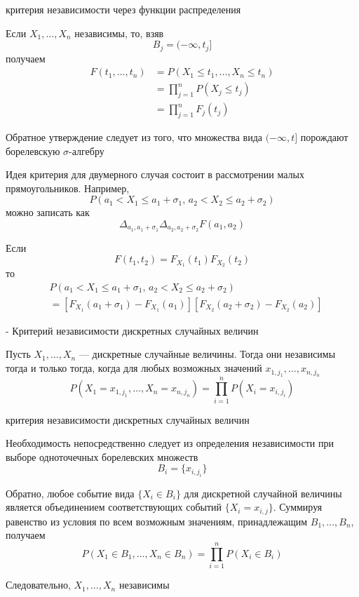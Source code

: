 \documentclass[12pt,a4paper]{article}
\begin{document}
\begin{proofbox}{критерия независимости через функции распределения}

Если $X_1,\ldots,X_n$ независимы, то, взяв
\[
B_j=(-\infty,t_j]
\]
получаем
\[
\begin{aligned}
F(t_1,\ldots,t_n)
&=
P(X_1\leq t_1,\ldots,X_n\leq t_n)\\
&=
\prod_{j=1}^nP(X_j\leq t_j)\\
&=
\prod_{j=1}^nF_j(t_j)
\end{aligned}
\]

Обратное утверждение следует из того, что множества вида $(-\infty,t]$ порождают борелевскую $\sigma$-алгебру

\end{proofbox}

\begin{note}

Идея критерия для двумерного случая состоит в рассмотрении малых прямоугольников. Например,
\[
P(a_1<X_1\leq a_1+\sigma_1,\,
  a_2<X_2\leq a_2+\sigma_2)
\]
можно записать как
\[
\Delta_{a_1,a_1+\sigma_1}
\Delta_{a_2,a_2+\sigma_2}
F(a_1,a_2)
\]

Если
\[
F(t_1,t_2)=F_{X_1}(t_1)F_{X_2}(t_2)
\]
то
\[
\begin{aligned}
&P(a_1<X_1\leq a_1+\sigma_1,\,
a_2<X_2\leq a_2+\sigma_2)\\
&=
\left[
F_{X_1}(a_1+\sigma_1)-F_{X_1}(a_1)
\right]
\left[
F_{X_2}(a_2+\sigma_2)-F_{X_2}(a_2)
\right]
\end{aligned}
\]

\end{note}

\begin{theorem}{- Критерий независимости дискретных случайных величин}

Пусть $X_1,\ldots,X_n$ --- дискретные случайные величины. Тогда они независимы тогда и только тогда, когда для любых возможных значений $x_{1,j_1},\ldots,x_{n,j_n}$
\[
P(X_1=x_{1,j_1},\ldots,X_n=x_{n,j_n})
=
\prod_{i=1}^nP(X_i=x_{i,j_i})
\]

\end{theorem}

\begin{proofbox}{критерия независимости дискретных случайных величин}

Необходимость непосредственно следует из определения независимости при выборе одноточечных борелевских множеств
\[
B_i=\{x_{i,j_i}\}
\]

Обратно, любое событие вида $\{X_i\in B_i\}$ для дискретной случайной величины является объединением соответствующих событий $\{X_i=x_{i,j}\}$. Суммируя равенство из условия по всем возможным значениям, принадлежащим $B_1,\ldots,B_n$, получаем
\[
P(X_1\in B_1,\ldots,X_n\in B_n)
=
\prod_{i=1}^nP(X_i\in B_i)
\]

Следовательно, $X_1,\ldots,X_n$ независимы

\end{proofbox}
\end{document}
